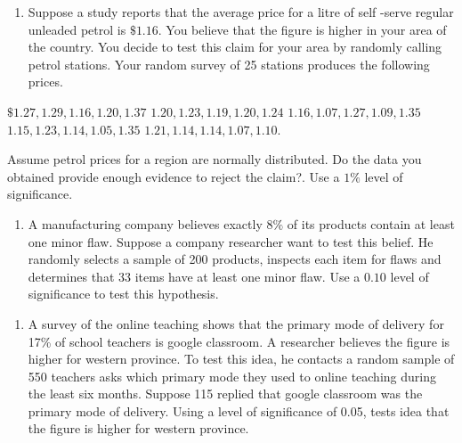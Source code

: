 \documentclass[]{book}
\providecommand{\tightlist}{%
  \setlength{\itemsep}{0pt}\setlength{\parskip}{0pt}}
\begin{document}
\begin{enumerate}
\def\labelenumi{\arabic{enumi}.}
\setcounter{enumi}{4}
\tightlist
\item
  Suppose a study reports that the average price for a litre of self -serve regular unleaded petrol is \(\$1.16\). You believe that the figure is higher in your area of the country. You decide to test this claim for your area by randomly calling petrol stations. Your random survey of 25 stations produces the following prices.
\end{enumerate}

\(\$1.27, 1.29, 1.16, 1.20, 1.37\)\newline
\(1.20, 1.23, 1.19, 1.20, 1.24\) \newline
\(1.16, 1.07, 1.27, 1.09, 1.35\) \newline
\(1.15, 1.23, 1.14, 1.05, 1.35\) \newline
\(1.21, 1.14, 1.14, 1.07,1.10\).

Assume petrol prices for a region are normally distributed. Do the data you obtained provide enough evidence to reject the claim?. Use a \(1\%\) level of significance.

\begin{enumerate}
\def\labelenumi{\arabic{enumi}.}
\setcounter{enumi}{5}
\tightlist
\item
  A manufacturing company believes exactly \(8\%\) of its products contain at least one minor flaw. Suppose a company researcher want to test this belief. He randomly selects a sample of 200 products, inspects each item for flaws and determines that 33 items have at least one minor flaw. Use a \(0.10\) level of significance to test this hypothesis.
\end{enumerate}

\begin{enumerate}
\def\labelenumi{\arabic{enumi}.}
\setcounter{enumi}{6}
\tightlist
\item
  A survey of the online teaching shows that the primary mode of delivery for 17\% of school teachers is google classroom. A researcher believes the figure is higher for western province. To test this idea, he contacts a random sample of 550 teachers asks which primary mode they used to online teaching during the least six months. Suppose 115 replied that google classroom was the primary mode of delivery. Using a level of significance of 0.05, tests idea that the figure is higher for western province.
\end{enumerate}
\end{document}

